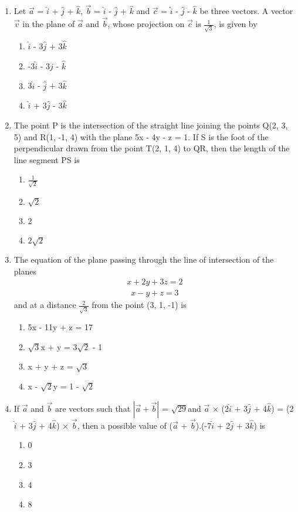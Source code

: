 \begin{enumerate}[label=\arabic*.,ref=\thesubsection.\theenumi]
\item Let $\overrightarrow{a}$ = $\hat{i}$ + $\hat{j}$ + $\hat{k}$, $\overrightarrow{b}$ = $\hat{i}$ - $\hat{j}$ + $\hat{k}$ and $\overrightarrow{c}$ = $\hat{i}$ - $\hat{j}$ - $\hat{k}$ be three vectors. A vector 
$\overrightarrow{v}$ in the plane of $\overrightarrow{a}$ and $\overrightarrow{b}$, whose projection on $\overrightarrow{c}$ is $\frac{1}{\sqrt{3}}$, is given by
\begin{enumerate}
\item $\hat{i}$ - 3$\hat{j}$ + 3$\hat{k}$
\item -3$\hat{i}$ - 3$\hat{j}$  -  $\hat{k}$
\item 3$\hat{i}$ - $\hat{j}$ + 3$\hat{k}$
\item $\hat{i}$ + 3$\hat{j}$ - 3$\hat{k}$
\end{enumerate}

\item The point P is the intersection of the straight line joining the points Q(2, 3, 5) and R(1, -1, 4) with the plane 5x - 4y - z = 1. If S is the foot of the perpendicular drawn from the point T(2, 1, 4) to QR, then 
the length of the line segment PS is
\begin{enumerate}
\item $\frac{1}{\sqrt{2}}$
\item $\sqrt{2}$
\item 2
\item $2\sqrt{2}$
\end{enumerate}

\item The equation of the plane passing through the line of intersection of the planes
\begin{align*}
x + 2y + 3z = 2
\end{align*}
\begin{align*}
x - y + z = 3
\end{align*}
and at a distance $\frac{2}{\sqrt{3}}$ from the point (3, 1, -1) is
\begin{enumerate}
\item 5x - 11y + z = 17
\item $\sqrt{3}$x + y = 3$\sqrt{2}$ - 1
\item x + y + z = $\sqrt{3}$
\item x - $\sqrt{2}$y = 1 - $\sqrt{2}$
\end{enumerate}

\item If $\overrightarrow{a}$ and $\overrightarrow{b}$ are vectors such that $|\overrightarrow{a} + \overrightarrow{b}|$ = $\sqrt{29}$and $\overrightarrow{a}$ $\times$ (2$\hat{i}$ + 3$\hat{j}$ + 4$\hat{k}$) = (2$\hat{i}$ + 3$\hat{j}$ + 4$\hat{k}$) $\times$ $\overrightarrow{b}$, then a possible value of ($\overrightarrow{a}$ + $\overrightarrow{b}$).(-7$\hat{i}$ + 2$\hat{j}$ + 3$\hat{k}$) is 
\begin{enumerate}
\item 0
\item 3
\item 4
\item 8
\end{enumerate}


\end{enumerate}
